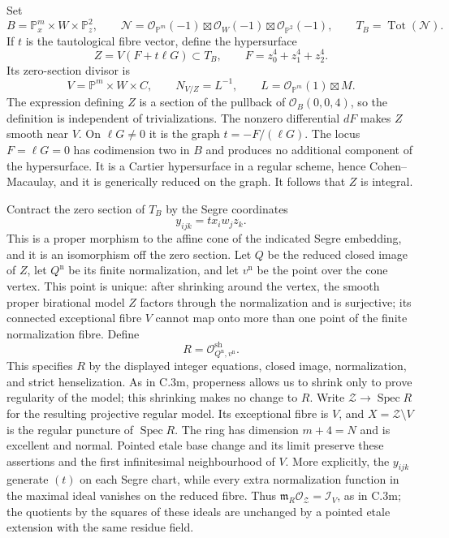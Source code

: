 Set
\[
 B=\mathbb P^m_x\times W\times\mathbb P^2_z,
 \qquad
 \mathcal N=\mathcal O_{\mathbb P^m}(-1)
       \boxtimes\mathcal O_W(-1)\boxtimes\mathcal O_{\mathbb P^2}(-1),
 \qquad T_B=\operatorname{Tot}(\mathcal N).
\]
If $t$ is the tautological fibre vector, define the hypersurface
\[
                   Z=V(F+t\ell G)\subset T_B,
                   \qquad F=z_0^4+z_1^4+z_2^4.
\]
Its zero-section divisor is
\[
 V=\mathbb P^m\times W\times C,
 \qquad N_{V/Z}=L^{-1},
 \qquad L=\mathcal O_{\mathbb P^m}(1)\boxtimes M.
\]
The expression defining $Z$ is a section of the pullback of
$\mathcal O_B(0,0,4)$, so the definition is independent of
trivializations. The nonzero differential $dF$ makes $Z$
smooth near $V$. On $\ell G\ne0$ it is the graph
$t=-F/(\ell G)$. The locus $F=\ell G=0$ has codimension two
in $B$ and produces no additional component of the
hypersurface. It is a Cartier hypersurface in a regular
scheme, hence Cohen--Macaulay, and it is generically
reduced on the graph. It follows that $Z$ is integral.

Contract the zero section of $T_B$ by the Segre coordinates
\[
                         y_{ijk}=t x_iw_jz_k.
\]
This is a proper morphism to the affine cone of the indicated
Segre embedding, and it is an isomorphism off the zero
section. Let $Q$ be the reduced closed image of $Z$, let
$Q^{\mathrm n}$ be its finite normalization, and let
$v^{\mathrm n}$ be the point over the cone vertex. This
point is unique: after shrinking around the vertex, the
smooth proper birational model $Z$ factors through the
normalization and is surjective; its connected exceptional
fibre $V$ cannot map onto more than one point of the finite
normalization fibre. Define
\[
 R=\mathcal O_{Q^{\mathrm n},v^{\mathrm n}}^{\mathrm{sh}}.
\]
This specifies $R$ by the displayed integer equations,
closed image, normalization, and strict henselization.
As in C.3m, properness allows us to shrink only to prove
regularity of the model; this shrinking makes no change
to $R$. Write $\mathcal Z\to\operatorname{Spec}R$ for
the resulting projective regular model. Its exceptional fibre
is $V$, and $X=\mathcal Z\setminus V$ is the regular
puncture of $\operatorname{Spec}R$. The ring has dimension
$m+4=N$ and is excellent and normal. Pointed etale base
change and its limit preserve these assertions and the
first infinitesimal neighbourhood of $V$. More explicitly,
the $y_{ijk}$ generate $(t)$ on each Segre chart, while
every extra normalization function in the maximal ideal
vanishes on the reduced fibre. Thus
$\mathfrak m_R\mathcal O_{\mathcal Z}=\mathcal I_V$,
as in C.3m; the quotients by the squares of these ideals
are unchanged by a pointed etale extension with the same
residue field.

